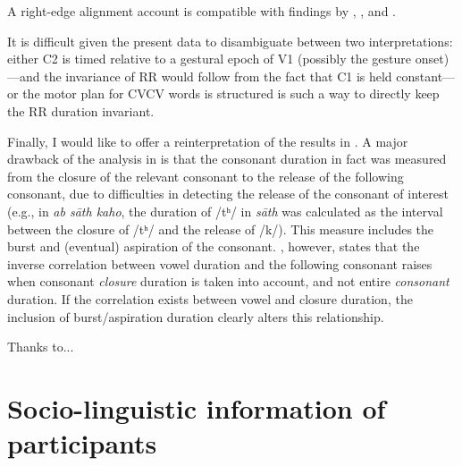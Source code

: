 \documentclass[]{JASAnew}
\begin{document}
A right-edge alignment account is compatible with findings by
\citet{raphael1975}, \citet{de-jong1991}, and \citet{celata2018}.

It is difficult given the present data to disambiguate between two
interpretations: either C2 is timed relative to a gestural epoch of V1
(possibly the gesture onset)---and the invariance of RR would follow
from the fact that C1 is held constant--- or the motor plan for CVCV
words is structured is such a way to directly keep the RR duration
invariant.

Finally, I would like to offer a reinterpretation of the results in
\citet{maddieson1976}. A major drawback of the analysis in
\citet{maddieson1976} is that the consonant duration in fact was
measured from the closure of the relevant consonant to the release of
the following consonant, due to difficulties in detecting the release of
the consonant of interest (e.g., in \emph{ab sāth kaho}, the duration of
/tʰ/ in \emph{sāth} was calculated as the interval between the closure
of /tʰ/ and the release of /k/). This measure includes the burst and
(eventual) aspiration of the consonant. \citet{slis1969a}, however,
states that the inverse correlation between vowel duration and the
following consonant raises when consonant \emph{closure} duration is
taken into account, and not entire \emph{consonant} duration. If the
correlation exists between vowel and closure duration, the inclusion of
burst/aspiration duration clearly alters this relationship.

\begin{acknowledgments}
Thanks to...
\end{acknowledgments}

\appendix

\section{Socio-linguistic information of participants}
\label{a:socioling}
\end{document}
